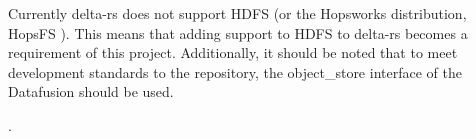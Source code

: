 Currently delta-rs does not support \gls{HDFS} (or the Hopsworks distribution, HopsFS \cite{niaziHopsFSScalingHierarchical2017}). This means that adding support to \gls{HDFS} to delta-rs becomes a requirement of this project. Additionally, it should be noted that to meet development standards to the repository, the object\_store \cite{Object_storeRust} interface of the Datafusion \cite{ApacheDataFusionApache} should be used.

.